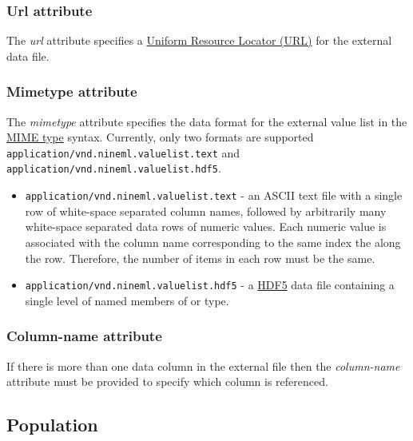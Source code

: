 \documentclass[draftspec]{ninemlspec}
\begin{document}
\subsubsection{Url attribute}
The \textit{url} attribute specifies a \href{http://en.wikipedia.org/wiki/Uniform_resource_locator}{Uniform Resource Locator (URL)} for the external data file.

\subsubsection{Mimetype attribute}
The \textit{mimetype} attribute specifies the data format for the external value list in the \href{http://en.wikipedia.org/wiki/Internet_media_type}{MIME type} syntax. Currently, only two formats are supported \lstinline|application/vnd.nineml.valuelist.text| and \lstinline|application/vnd.nineml.valuelist.hdf5|. 

\begin{itemize}
\item \lstinline|application/vnd.nineml.valuelist.text| - an ASCII text file with a single row of white-space separated column names, followed by arbitrarily many white-space separated data rows of numeric values. Each numeric value is associated with the column name corresponding to the same index the along the row. Therefore, the number of items in each row must be the same.
\item \lstinline|application/vnd.nineml.valuelist.hdf5| - a \href{http://www.hdfgroup.org/HDF5/}{HDF5} data file containing a single level of named members of  or  type.
\end{itemize}

\subsubsection{Column-name attribute}
If there is more than one data column in the external file then the \textit{column-name} attribute must be provided to specify which column is referenced.

\subsection{Population}
\label{sec:Population}
\end{document}
